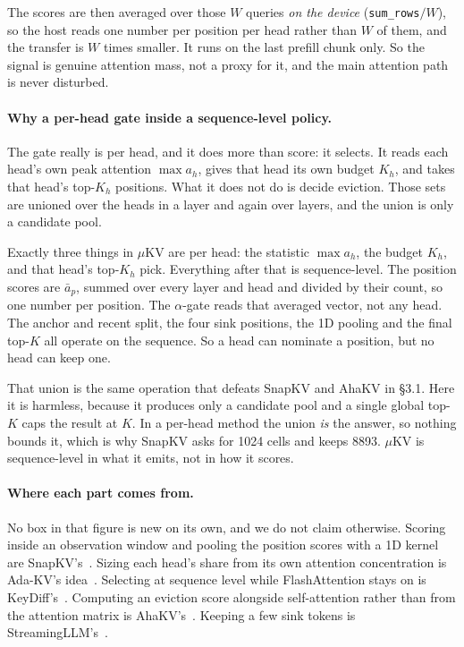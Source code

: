 \documentclass[11pt]{article}
\begin{document}
The scores are then averaged over those $W$ queries \emph{on the device}
(\texttt{sum\_rows}$/W$), so the host reads one number per position per head rather than $W$ of
them, and the transfer is $W$ times smaller. It runs on the last prefill chunk only. So the
signal is genuine attention mass, not a proxy for it, and the main attention path is never
disturbed.

\paragraph{Why a per-head gate inside a sequence-level policy.} The gate really is per head,
and it does more than score: it selects. It reads each head's own peak attention $\max a_h$,
gives that head its own budget $K_h$, and takes that head's top-$K_h$ positions. What it does
not do is decide eviction. Those sets are unioned over the heads in a layer and again over
layers, and the union is only a candidate pool.

Exactly three things in $\mu$KV are per head: the statistic $\max a_h$, the budget $K_h$, and
that head's top-$K_h$ pick. Everything after that is sequence-level. The position scores are
$\bar a_p$, summed over every layer and head and divided by their count, so one number per
position. The $\alpha$-gate reads that averaged vector, not any head. The anchor and recent
split, the four sink positions, the 1D pooling and the final top-$K$ all operate on the
sequence. So a head can nominate a position, but no head can keep one.

That union is the same operation that defeats SnapKV and AhaKV in \S3.1. Here it is harmless,
because it produces only a candidate pool and a single global top-$K$ caps the result at $K$.
In a per-head method the union \emph{is} the answer, so nothing bounds it, which is why SnapKV
asks for 1024 cells and keeps 8893. $\mu$KV is sequence-level in what it emits, not in how it
scores.

\paragraph{Where each part comes from.} No box in that figure is new on its own, and we do not
claim otherwise. Scoring inside an observation window and pooling the position scores with a 1D
kernel are SnapKV's~\cite{snapkv}. Sizing each head's share from its own attention
concentration is Ada-KV's idea~\cite{adakv}. Selecting at sequence level while FlashAttention
stays on is KeyDiff's~\cite{keydiff}. Computing an eviction score alongside self-attention
rather than from the attention matrix is AhaKV's~\cite{ahakv}. Keeping a few sink tokens is
StreamingLLM's~\cite{streamingllm}.
\end{document}
